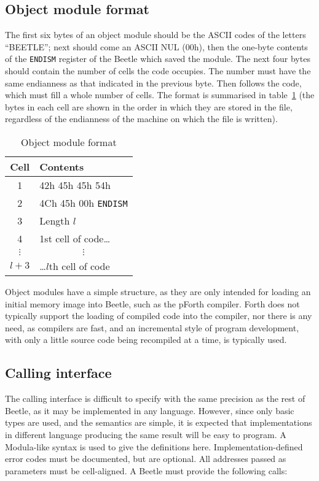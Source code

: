 \documentclass[english]{article}
\begin{document}
\subsection{Object module format}
\label{object}

The first six bytes of an object module should be the ASCII codes of the letters
``BEETLE''; next should come an ASCII NUL (00h), then the one-byte contents of
the {\tt ENDISM} register of the Beetle which saved the module. The next four
bytes should contain the number of cells the code occupies. The number must have
the same endianness as that indicated in the previous byte. Then follows the
code, which must fill a whole number of cells. The format is summarised in table~\ref{objecttable}
(the bytes in each cell are shown in the order in which they
are stored in the file, regardless of the endianness of the machine on which the
file is written).

\begin{table}[htbp]
\begin{center}
\begin{tabular}{cl} \toprule
\bf Cell & \bf Contents \\ \midrule
1 & 42h 45h 45h 54h \\
2 & 4Ch 45h 00h {\tt ENDISM} \\
3 & Length $l$\/ \\
4 & 1st cell of code\dots \\
$\vdots$ & \multicolumn{1}{c}{$\vdots$} \\
$l+3$\/ & \dots$l$\/th cell of code \\ \bottomrule
\end{tabular}
\caption{\label{objecttable}Object module format}
\end{center}
\end{table}

Object modules have a simple structure, as they are only intended for loading an
initial memory image into Beetle, such as the pForth compiler. Forth does not
typically support the loading of compiled code into the compiler, nor there is
any need, as compilers are fast, and an incremental style of program
development, with only a little source code being recompiled at a time, is
typically used.


\subsection{Calling interface}
\label{calls}

The calling interface is difficult to specify with the same precision as the
rest of Beetle, as it may be implemented in any language. However, since only
basic types are used, and the semantics are simple, it is expected that
implementations in different language producing the same result will be easy to
program. A Modula-like syntax is used to give the definitions here.
Implementation-defined error codes must be documented, but are optional. All
addresses passed as parameters must be cell-aligned. A Beetle must provide the
following calls:
\end{document}
